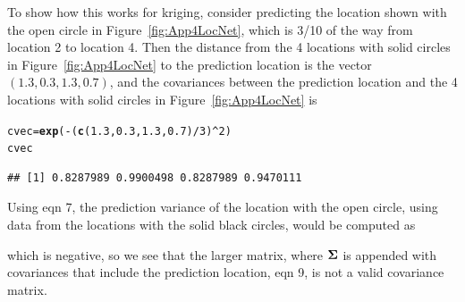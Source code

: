 \documentclass[11pt, titlepage]{article}\usepackage[]{graphicx}\usepackage[]{color}
\makeatletter
\newcommand{\hlnum}[1]{\textcolor[rgb]{0.686,0.059,0.569}{#1}}%
\newcommand{\hlopt}[1]{\textcolor[rgb]{0,0,0}{#1}}%
\newcommand{\hlstd}[1]{\textcolor[rgb]{0.345,0.345,0.345}{#1}}%
\newcommand{\hlkwb}[1]{\textcolor[rgb]{0.69,0.353,0.396}{#1}}%
\newcommand{\hlkwd}[1]{\textcolor[rgb]{0.737,0.353,0.396}{\textbf{#1}}}%
\newenvironment{kframe}{%
 \def\at@end@of@kframe{}%
 \ifinner\ifhmode%
  \def\at@end@of@kframe{\end{minipage}}%
  \begin{minipage}{\columnwidth}%
 \fi\fi%
 \def\FrameCommand##1{\hskip\@totalleftmargin \hskip-\fboxsep
 \colorbox{shadecolor}{##1}\hskip-\fboxsep
     \hskip-\linewidth \hskip-\@totalleftmargin \hskip\columnwidth}%
 \MakeFramed {\advance\hsize-\width
   \@totalleftmargin\z@ \linewidth\hsize
   \@setminipage}}%
 {\par\unskip\endMakeFramed%
 \at@end@of@kframe}
\newenvironment{knitrout}{}{} %
\makeatother
\begin{document}
\begin{spacing}{1.9}
To show how this works for kriging, consider predicting the location shown with the open circle in Figure~\ref{fig:App4LocNet}, which is 3/10 of the way from location 2 to location 4.  Then the distance from the 4 locations with solid circles in Figure~\ref{fig:App4LocNet} to the prediction location is the vector $(1.3, 0.3, 1.3, 0.7)$, and the covariances between the prediction location and the 4 locations with solid circles in Figure~\ref{fig:App4LocNet} is 
\begin{singlespace}
\begin{knitrout}
\color{fgcolor}\begin{kframe}
\begin{alltt}
\hlstd{cvec} \hlkwb{=} \hlkwd{exp}\hlstd{(}\hlopt{-}\hlstd{(}\hlkwd{c}\hlstd{(}\hlnum{1.3}\hlstd{,} \hlnum{0.3}\hlstd{,} \hlnum{1.3}\hlstd{,} \hlnum{0.7}\hlstd{)}\hlopt{/}\hlnum{3}\hlstd{)}\hlopt{^}\hlnum{2}\hlstd{)}
\hlstd{cvec}
\end{alltt}
\begin{verbatim}
## [1] 0.8287989 0.9900498 0.8287989 0.9470111
\end{verbatim}
\end{kframe}
\end{knitrout}
\end{singlespace}
\noindent Using eqn 7, the prediction variance of the location with the open circle, using data from the locations with the solid black circles, would be computed as
\noindent which is negative, so we see that the larger matrix, where $\mbox{\boldmath $\Sigma$}$ is appended with covariances that include the prediction location, eqn 9, is not a valid covariance matrix. 



\end{spacing}
\end{document}
